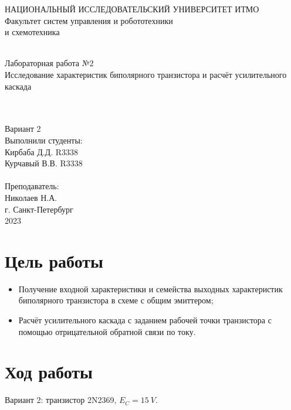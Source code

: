 \documentclass[12pt]{article}
\begin{document}
\begin{titlepage}
\begin{center}
    {\small НАЦИОНАЛЬНЫЙ ИССЛЕДОВАТЕЛЬСКИЙ УНИВЕРСИТЕТ ИТМО} \\
    {\small Факультет систем управления и робототехники} \\
    \vspace*{10\baselineskip}
    { и схемотехника} \\
    \ \\
    \begin{spacing}{1.5}
    {\large Лабораторная работа №2 \\
    Исследование характеристик биполярного транзистора и расчёт усилительного каскада} \\
    \end{spacing} \\
    \ \\
    Вариант 2 \\
    \vspace*{10\baselineskip}
    \hfill {Выполнили студенты:} \\
    \hfill {Кирбаба Д.Д. R3338} \\
    \hfill {Курчавый В.В. R3338} \\
    \ \\
    \hfill {Преподаватель:} \\
    \hfill {Николаев Н.А.} \\
    \mbox{}
    \vfill {г. Санкт-Петербург\\2023}
\end{center}
\end{titlepage}

\section*{Цель работы}
\begin{itemize}
  \item Получение входной характеристики и семейства выходных характеристик биполярного транзистора в схеме с общим эмиттером;
  \item Расчёт усилительного каскада с заданием рабочей точки транзистора с помощью отрицательной обратной связи по току.
\end{itemize}

\section*{Ход работы}
Вариант 2: транзистор 2N2369, $E_C = 15 \ V$.
\end{document}

